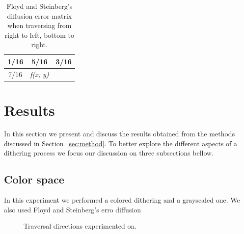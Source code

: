 \documentclass[conference]{IEEEtran}
\begin{document}
\begin{table}[H]
\centering
\renewcommand{\arraystretch}{1.5}
\begin{tabular}{c|c|c}
1/16 & 5/16             & 3/16 \\ \hline
7/16 & \textit{f(x, y)} &     
\end{tabular}
\caption{Floyd and Steinberg's diffusion error matrix when traversing from right to left, bottom to right.}
\label{tab:flo_inverse}
\end{table}

\section{Results}
\label{sec:results}

In this section we present and discuss the results obtained from the methods discussed in Section~\ref{sec:method}. To better explore the different aspects of a dithering process we focus our discussion on three subsections bellow.

\subsection{Color space}

In this experiment we performed a colored dithering and a grayscaled one. We also used Floyd and Steinberg's erro diffusion

\begin{figure}[H]
	\centering
	\quad
	\caption{Traversal directions experimented on.}
	\label{fig:baboon_colorspace}
\end{figure}
\end{document}
